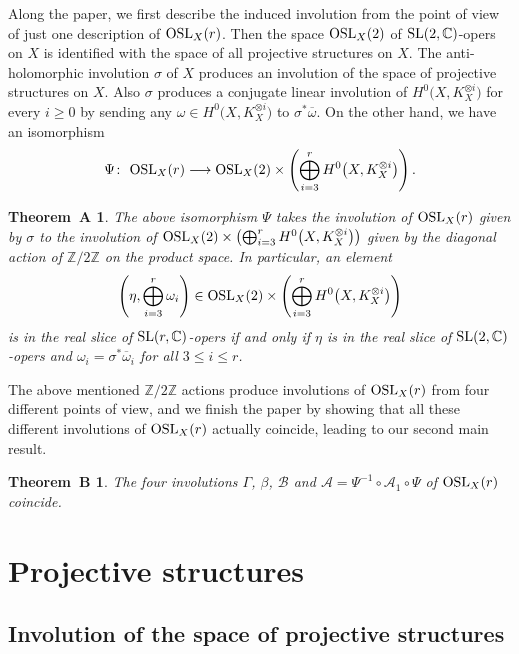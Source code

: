 \documentclass[10pt,a4paper]{amsart}
\numberwithin{equation}{section}
\newtheorem*{TheoremA}{Theorem~A}
\newtheorem*{TheoremB}{Theorem~B}
\begin{document}
Along the paper, we first describe the induced involution from the point of view of just one description of
${\rm OSL}_X(r)$.
Then the space ${\rm OSL}_X(2)$ of ${\rm SL}(2,{\mathbb C})$-opers on $X$ is identified with the space of all
projective structures on $X$. The anti-holomorphic involution $\sigma$ of $X$ produces
an involution of the space of projective structures on $X$. Also $\sigma$ produces a conjugate linear involution of
$H^0\bigl(X, K^{\otimes i}_X\bigr)$ for every $i \geq 0$ by sending any $\omega \in H^0\bigl(X, K^{\otimes i}_X\bigr)$
to $\sigma^*\overline{\omega}$. On the other hand, we have an isomorphism
\[
\Psi\colon\ {\rm OSL}_X(r) \longrightarrow {\rm OSL}_X(2)\times \left(\bigoplus_{i=3}^r H^0\bigl(X, K^{\otimes i}_X\bigr)\right).
\]


\begin{TheoremA}
The above isomorphism $\Psi$ takes the involution of ${\rm OSL}_X(r)$ given by $\sigma$ to the
involution of ${\rm OSL}_X(2)\times \bigl(\bigoplus_{i=3}^r H^0\bigl(X, K^{\otimes i}_X\bigr)\bigr)$ given by the diagonal action of
${\mathbb Z}/2\mathbb Z$ on the product space. In particular, an element
\[
\left(\eta, \bigoplus_{i=3}^r \omega_i\right) \in
{\rm OSL}_X(2)\times \left(\bigoplus_{i=3}^r H^0\bigl(X, K^{\otimes i}_X\bigr)\right)
\]
is in the real slice of ${\rm SL}(r,{\mathbb C})$-opers
if and only if $\eta$ is in the real slice of ${\rm SL}(2,{\mathbb C})$-opers and
$\omega_i = \sigma^*\overline{\omega}_i$ for all $3 \leq i \leq r$.
\end{TheoremA}


The above mentioned ${\mathbb Z}/2\mathbb Z$ actions produce involutions of ${\rm OSL}_X(r)$
from four different points of view, and we finish the paper by showing that all these different involutions of
${\rm OSL}_X(r)$ actually coincide, leading to our second main result.

\begin{TheoremB}
The four involutions $\Gamma$, $\beta$, $\mathcal B$ and $\mathcal A=\Psi^{-1}\circ\mathcal A_1\circ\Psi$ of
${\rm OSL}_X(r)$ coincide.
\end{TheoremB}

\section{Projective structures}

\subsection{Involution of the space of projective structures}
\end{document}
